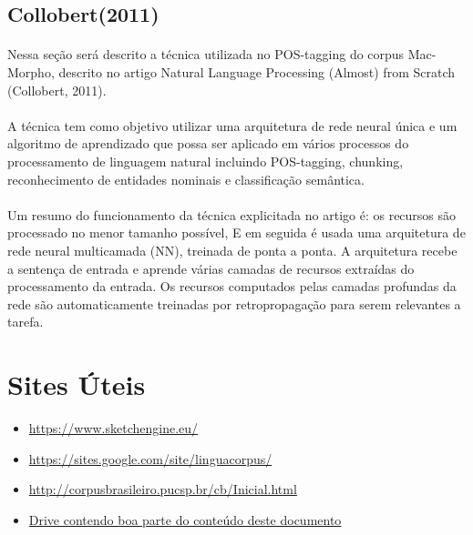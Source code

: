 \documentclass[a4paper, 10pt]{article}
\begin{document}
	    \subsection{Collobert(2011)}
            \paragraph{}
            Nessa seção será descrito a técnica utilizada no POS-tagging do corpus Mac-Morpho, descrito no artigo Natural Language Processing (Almost) from Scratch (Collobert, 2011).
            \paragraph{}
            A técnica tem como objetivo utilizar uma arquitetura de rede neural única e um algoritmo de aprendizado que possa ser aplicado em vários processos do processamento de linguagem natural incluindo POS-tagging, chunking, reconhecimento de entidades nominais e classificação semântica.
            \paragraph{}
            Um resumo do funcionamento da técnica explicitada no artigo é: os recursos são processado no menor tamanho possível,  E em seguida é usada uma arquitetura de rede neural multicamada (NN), treinada de ponta a ponta. A arquitetura recebe a sentença de entrada e aprende várias camadas de recursos extraídas do processamento da entrada. Os recursos computados pelas camadas profundas da rede são automaticamente treinadas por retropropagação para serem relevantes a tarefa.

    \section{Sites Úteis}
        \begin{itemize}
            \item \href{https://www.sketchengine.eu/}{https://www.sketchengine.eu/}
            \item \href{https://sites.google.com/site/linguacorpus/}{https://sites.google.com/site/linguacorpus/} 
            \item \href{http://corpusbrasileiro.pucsp.br/cb/Inicial.html}{http://corpusbrasileiro.pucsp.br/cb/Inicial.html} 
            \item \href{https://drive.google.com/open?id=1G9of0GN_fJC-7IREvetYhzn4XaQWWojG}{Drive contendo boa parte do conteúdo deste documento}
        \end{itemize}
\end{document}
